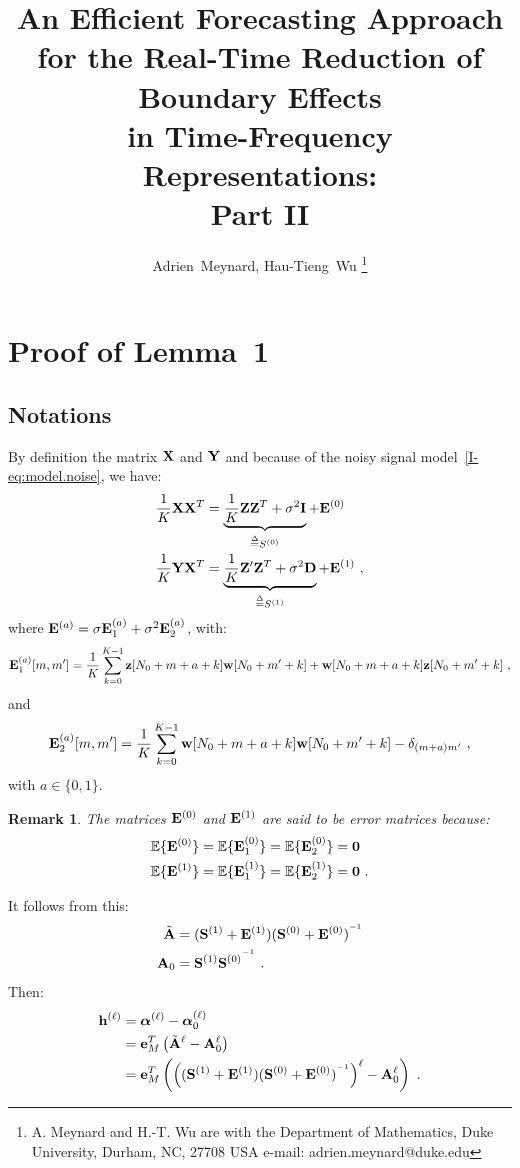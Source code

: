 \documentclass[journal,onecolumn]{IEEEtran}
\title{An Efficient Forecasting Approach for the Real-Time Reduction of Boundary Effects\\ in Time-Frequency Representations:\\ Part II}
\author{Adrien~Meynard, %
        Hau-Tieng~Wu
\thanks{A. Meynard and H.-T. Wu are with the Department
of Mathematics, Duke University, Durham,
NC, 27708 USA e-mail: adrien.meynard@duke.edu}}
\newtheorem{remark}{Remark}
\begin{document}
\maketitle


\section{Proof of Lemma~1}
\label{ap:lm.error}

\subsection{Notations}
By definition the matrix ${\mathbf X}$ and ${\mathbf Y}$ and because of the noisy signal model~\eqref{I-eq:model.noise}, we have:
\begin{align}
\dfrac1K{\mathbf X}{\mathbf X}^T &= \underbrace{\dfrac1K{\mathbf Z}{\mathbf Z}^T+\sigma^2{\mathbf I}}_{\overset{\Delta}{=} S^{(0)}} + {\mathbf E}^{(0)} \\
\dfrac1K{\mathbf Y}{\mathbf X}^T &= \underbrace{\dfrac1K{\mathbf Z}'{\mathbf Z}^T +\sigma^2{\mathbf D}}_{\overset{\Delta}{=} S^{(1)}}+ {\mathbf E}^{(1)} \ ,
\end{align}
where ${\mathbf E}^{(a)} = \sigma{\mathbf E}_1^{(a)} + \sigma^2{\mathbf E}_2^{(a)}$, with:
\[
{\mathbf E}_1^{(a)}[m,m'] = \dfrac1K\sum_{k=0}^{K-1} {\mathbf z}[N_0+m+a+k]{\mathbf w}[N_0+m'+k] + {\mathbf w}[N_0+m+a+k]{\mathbf z}[N_0+m'+k]\ ,
\]
and
\[
{\mathbf E}_2^{(a)}[m,m'] =  \dfrac1K\sum_{k=0}^{K-1} {\mathbf w}[N_0+m+a+k]{\mathbf w}[N_0+m'+k] - \delta_{(m+a)m'}\ ,
\]
with $a\in\{0,1\}$.

\begin{remark}
The matrices ${\mathbf E}^{(0)}$ and ${\mathbf E}^{(1)}$ are said to be error matrices because:
\begin{align*}
{\mathbb E}\{{\mathbf E}^{(0)}\} &= {\mathbb E}\{{\mathbf E}_1^{(0)}\} = {\mathbb E}\{{\mathbf E}_2^{(0)}\} = \boldsymbol{0} \\
{\mathbb E}\{{\mathbf E}^{(1)}\} &= {\mathbb E}\{{\mathbf E}_1^{(1)}\} = {\mathbb E}\{{\mathbf E}_2^{(1)}\} = \boldsymbol{0}\ .
\end{align*}
\end{remark}

It follows from this:
\begin{align*}
\tilde{{\mathbf A}} &= ({\mathbf S}^{(1)}+{\mathbf E}^{(1)})({\mathbf S}^{(0)}+{\mathbf E}^{(0)})^{^{-1}} \\
{\mathbf A}_0 &={\mathbf S}^{(1)}{{\mathbf S}^{(0)}}^{^{-1}}\ .
\end{align*}
Then:
\begin{align}
\nonumber
\bh^{(\ell)} &= \balpha^{(\ell)} - \balpha^{(\ell)}_0 \\
\nonumber
&= \be_M^T\left(\tilde\bA^\ell-\bA_0^\ell\right) \\
&= \be_M^T\left(\left((\bS^{(1)}+\bE^{(1)})(\bS^{(0)}+\bE^{(0)})^\inv\right)^\ell- \bA_0^\ell\right)\ .
\label{eq:error.vec}
\end{align}
\end{document}
